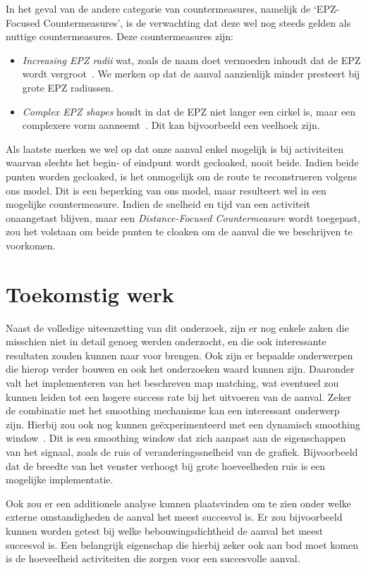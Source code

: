 In het geval van de andere categorie van countermeasures, namelijk de
`EPZ-Focused Countermeasures', is de verwachting dat deze wel nog steeds gelden
als nuttige countermeasures. Deze countermeasures zijn:
\begin{itemize}
      \item \textit{Increasing \ac{EPZ} radii} wat, zoals de naam doet vermoeden inhoudt dat de \ac{EPZ} wordt vergroot~\cite{Dhondt}. We merken op dat de aanval
            aanzienlijk minder presteert bij grote \ac{EPZ} radiussen.
      \item \textit{Complex \ac{EPZ} shapes} houdt in dat de \ac{EPZ} niet langer een cirkel is, maar een
            complexere vorm aanneemt~\cite{Dhondt}. Dit kan bijvoorbeeld een veelhoek zijn.
\end{itemize}

Als laatste merken we wel op dat onze aanval enkel mogelijk is bij activiteiten
waarvan slechts het begin- of eindpunt wordt gecloaked, nooit beide. Indien
beide punten worden gecloaked, is het onmogelijk om de route te reconstrueren
volgens ons model. Dit is een beperking van ons model, maar resulteert wel in
een mogelijke countermeasure. Indien de snelheid en tijd van een activiteit
onaangetast blijven, maar een \textit{Distance-Focused Countermeasure} wordt
toegepast, zou het volstaan om beide punten te cloaken om de aanval die we
beschrijven te voorkomen.

\section{Toekomstig werk}
Naast de volledige uiteenzetting van dit onderzoek, zijn er nog enkele zaken
die misschien niet in detail genoeg werden onderzocht, en die ook interessante
resultaten zouden kunnen naar voor brengen. Ook zijn er bepaalde onderwerpen
die hierop verder bouwen en ook het onderzoeken waard kunnen zijn. Daaronder
valt het implementeren van het beschreven map matching, wat eventueel zou
kunnen leiden tot een hogere success rate bij het uitvoeren van de aanval.
Zeker de combinatie met het smoothing mechanisme kan een interessant onderwerp
zijn. Hierbij zou ook nog kunnen geëxperimenteerd met een dynamisch smoothing
window~\cite{shmoothing}. Dit is een smoothing window dat zich aanpast aan de
eigenschappen van het signaal, zoals de ruis of veranderingssnelheid van de
grafiek. Bijvoorbeeld dat de breedte van het venster verhoogt bij grote
hoeveelheden ruis is een mogelijke implementatie.

Ook zou er een additionele analyse kunnen plaatsvinden om te zien onder welke
externe omstandigheden de aanval het meest succesvol is. Er zou bijvoorbeeld
kunnen worden getest bij welke bebouwingsdichtheid de aanval het meest
succesvol is. Een belangrijk eigenschap die hierbij zeker ook aan bod moet
komen is de hoeveelheid activiteiten die zorgen voor een succesvolle aanval.

